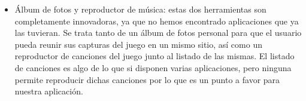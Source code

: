 \begin{itemize}
	\item Álbum de fotos y reproductor de música: estas dos herramientas son completamente innovadoras, ya que no hemos encontrado aplicaciones que ya las tuvieran. Se trata tanto de un álbum de fotos personal para que el usuario pueda reunir sus capturas del juego en un mismo sitio, así como un reproductor de canciones del juego junto al listado de las mismas. El listado de canciones es algo de lo que si disponen varias aplicaciones, pero ninguna permite reproducir dichas canciones por lo que es un punto a favor para nuestra aplicación.
	
\end{itemize}








 